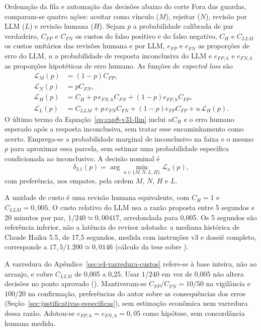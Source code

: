 \begin{chapter}{Ordenação da fila e automação das decisões abaixo do corte}
Fora das guardas, comparam-se quatro ações: aceitar como vínculo ($M$), rejeitar ($N$), revisão por LLM ($L$) e revisão humana ($H$). Sejam $p$ a probabilidade calibrada de par verdadeiro, $C_{FP}$ e $C_{FN}$ os custos do falso positivo e do falso negativo, $C_H$ e $C_{LLM}$ os custos unitários das revisões humana e por LLM, $e_{FP}$ e $e_{FN}$ as proporções de erro do LLM, $u$ a probabilidade de resposta inconclusiva do LLM e $e_{FP,h}$ e $e_{FN,h}$ as proporções hipotéticas de erro humano. As funções de \textit{expected loss} são
\begin{align}
\mathcal{L}_M(p)&=(1-p)C_{FP}, \label{eq:cap8-v31-match}\\
\mathcal{L}_N(p)&=pC_{FN},\\
\mathcal{L}_H(p)&=C_H+p\,e_{FN,h}C_{FN}+(1-p)e_{FP,h}C_{FP},\\
\mathcal{L}_L(p)&=C_{LLM}+p\,e_{FN}C_{FN}+(1-p)e_{FP}C_{FP}+u\,\mathcal{L}_H(p).
\label{eq:cap8-v31-llm}
\end{align}
O último termo da Equação~\ref{eq:cap8-v31-llm} inclui $uC_H$ e o erro humano esperado após a resposta inconclusiva, sem tratar esse encaminhamento como acerto. Emprega-se a probabilidade marginal de inconclusivo na faixa e o mesmo $p$ para aproximar essa parcela, sem estimar uma probabilidade específica condicionada ao inconclusivo. A decisão nominal é
\[
\delta_{3.1}(p)=\arg\min_{a\in\{M,N,L,H\}}\mathcal{L}_a(p),
\]
com preferência, nos empates, pela ordem $M$, $N$, $H$ e $L$.

A unidade de custo é uma revisão humana equivalente, com $C_H=1$ e $C_{LLM}=0{,}005$. O custo relativo do LLM usa a razão proposta entre 5 segundos e 20 minutos por par, $1/240\simeq0{,}00417$, arredondada para 0,005. Os 5 segundos são referência inferior, não a latência do revisor adotado: a mediana histórica de Claude Haiku 5.5, de 17,5 segundos, medida com instruções v3 e dossiê completo, corresponde a $17{,}5/1.200\simeq0{,}0146$ (cálculo da tese sobre ).

A varredura do Apêndice~\ref{sec:e4-varredura-custos} refere-se à base inteira, não ao arranjo, e cobre $C_{LLM}$ de 0,005 a 0,25. Usar $1/240$ em vez de 0,005 não altera decisões no ponto aprovado (). Mantiveram-se $C_{FP}/C_{FN}=10/50$ na vigilância e $100/20$ na confirmação, preferências do autor sobre as consequências dos erros (Seção~\ref{sec:justificativas-especificas}), sem estimação econômica nem varredura dessa razão. Adotou-se $e_{FP,h}=e_{FN,h}=0{,}05$ como hipótese, sem concordância humana medida.


\end{chapter}
